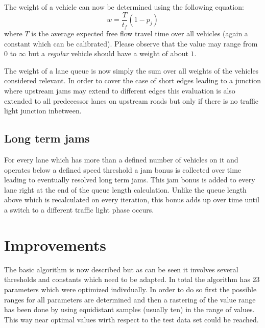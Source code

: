 \documentclass[sigconf,authordraft]{acmart}
\begin{document}
The weight of a vehicle can now be determined using the following equation:
\begin{equation}
w = \frac{T}{t_f} (1- p_j)
\end{equation}
where $T$ is the average expected free flow travel time over all vehicles (again a constant 
which can be calibrated). Please observe that the value may range from $0$ to $\infty$ but 
a \emph{regular} vehicle should have a weight of about $1$.

The weight of a lane queue is now simply the sum over all weights of the vehicles considered relevant.
In order to cover the case of short edges leading to a junction where upstream jams may extend to
different edges this evaluation is also extended to all predecessor lanes on upstream roads but only if
there is no traffic light junction inbetween.

\subsection{Long term jams}
For every lane which has more than a defined number of vehicles on it and operates below
a defined speed threshold a jam bonus is collected over time leading to eventually 
resolved long term jams. This jam bonus is added to every lane right at the end of the queue
length calculation. Unlike the queue length above which is recalculated on every iteration,
this bonus adds up over time until a switch to a different traffic light phase occurs.

\section{Improvements}
The basic algorithm is now described but as can be seen it involves several thresholds and constants
which need to be adapted. In total the algorithm has 23 parameters which were optimized indivdually.
In order to do so first the possible ranges for all parameters are determined and then a rastering
of the value range has been done by using equidistant samples (usually ten) in the range of values.
This way near optimal values wirth respect to the test data set could be reached.
\end{document}
